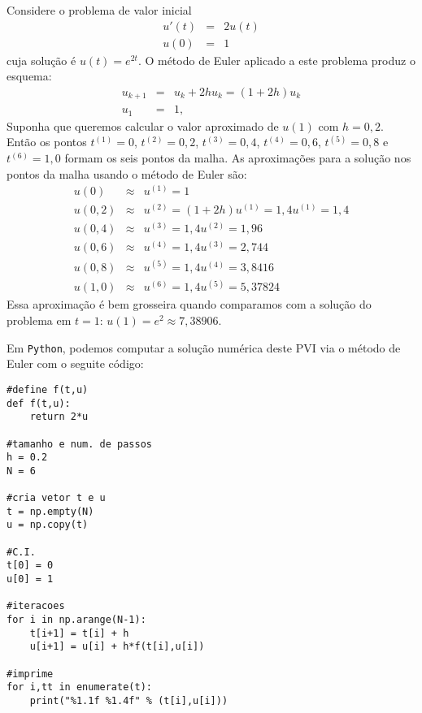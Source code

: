 \begin{ex}
Considere o problema de valor inicial
\begin{eqnarray*}
  u'(t)&=&2u(t)\\
  u(0)&=&1
\end{eqnarray*}
cuja solução é $u(t)=e^{2t}$. O método de Euler aplicado a este problema produz o  esquema:
\begin{eqnarray*}
  u_{k+1}&=&u_k+2hu_k=(1+2h)u_k\\
  u_1&=&1,
\end{eqnarray*}
Suponha que queremos calcular o valor aproximado de $u(1)$ com $h=0,2$. Então os pontos $t^{(1)}=0$, $t^{(2)}=0,2$, $t^{(3)}=0,4$, $t^{(4)}=0,6$, $t^{(5)}=0,8$ e $t^{(6)}=1,0$ formam os seis pontos da malha. As aproximações para a solução nos pontos da malha usando o método de Euler são:
\begin{eqnarray*}
  u(0)  &\approx &u^{(1)}=1\\
  u(0,2)&\approx &u^{(2)}=(1+2h) u^{(1)}=1,4 u^{(1)}=1,4\\
  u(0,4)&\approx &u^{(3)}=1,4 u^{(2)}=1,96\\
  u(0,6)&\approx &u^{(4)}=1,4 u^{(3)}=2,744\\
  u(0,8)&\approx &u^{(5)}=1,4 u^{(4)}=3,8416\\
  u(1,0)&\approx &u^{(6)}=1,4 u^{(5)}=5,37824
\end{eqnarray*}
Essa aproximação é bem grosseira quando comparamos com a solução do problema em $t=1$: $u(1)=e^{2}\approx 7,38906$.

\ifispython
Em \verb+Python+, podemos computar a solução numérica deste PVI via o método de Euler com o seguite código:
\begin{verbatim}
#define f(t,u)
def f(t,u):
    return 2*u

#tamanho e num. de passos
h = 0.2
N = 6

#cria vetor t e u
t = np.empty(N)
u = np.copy(t)

#C.I.
t[0] = 0
u[0] = 1

#iteracoes
for i in np.arange(N-1):
    t[i+1] = t[i] + h
    u[i+1] = u[i] + h*f(t[i],u[i])

#imprime
for i,tt in enumerate(t):
    print("%1.1f %1.4f" % (t[i],u[i]))
\end{verbatim}
\fi
\end{ex}


